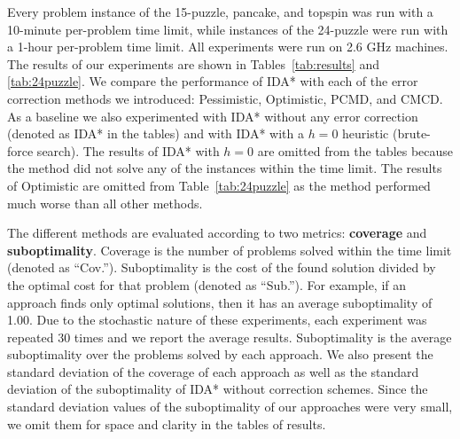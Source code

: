 \documentclass[letterpaper]{article}
\begin{document}
Every problem instance of the 15-puzzle, pancake, and topspin was run with a 10-minute per-problem time limit, while instances of the 24-puzzle were run with a 1-hour per-problem time limit. All experiments were run
%
%
on 2.6 GHz machines. %
The results of our experiments are shown in Tables~\ref{tab:results} and \ref{tab:24puzzle}.
%
We compare the performance of IDA* with each of the error correction methods we introduced: Pessimistic, Optimistic, PCMD, and CMCD. As a baseline we also experimented with IDA* without any error correction (denoted as IDA* in the tables) and with IDA* with a $h=0$ heuristic (brute-force search). The results of IDA* with $h=0$ are omitted from the tables because
the method
did not solve any of the instances within the time limit. The results of Optimistic are omitted from Table~\ref{tab:24puzzle} as the method performed much worse than all other methods.

The different methods are evaluated according to two metrics: \textbf{coverage} and \textbf{suboptimality}. Coverage is the number of problems solved within the time limit (denoted as ``Cov.'').
Suboptimality is the cost of the found solution divided by the optimal cost for that problem (denoted as ``Sub.''). For example, if an approach finds only optimal solutions, then it has an average suboptimality of 1.00.
%
%
%
Due to the stochastic nature of these experiments, each experiment was repeated 30 times and we report the average results. Suboptimality is the average suboptimality over the problems solved by each approach. We also present the standard deviation of the coverage of each approach as well as the standard deviation of the suboptimality of IDA* without correction schemes. Since the standard deviation values of the suboptimality of our approaches were very small, we omit them for space and clarity in the tables of results.
\end{document}
